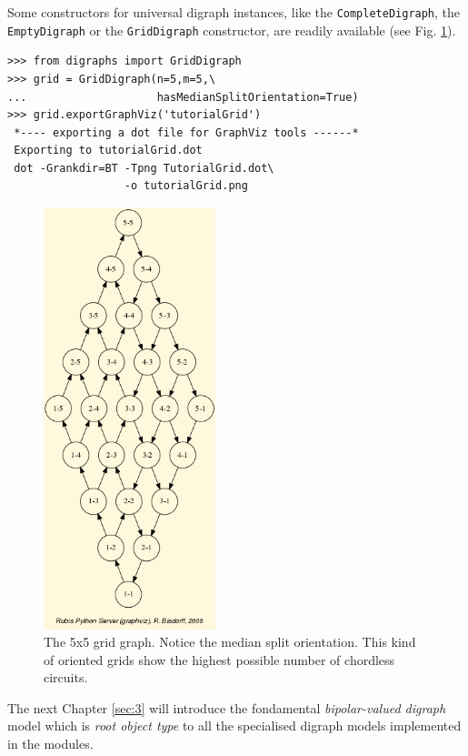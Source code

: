 Some constructors for universal digraph instances, like the \texttt{CompleteDigraph}, the \texttt{EmptyDigraph} or the \texttt{GridDigraph} constructor, are readily available (see Fig. \ref{fig:1.3}).
\begin{lstlisting}
>>> from digraphs import GridDigraph
>>> grid = GridDigraph(n=5,m=5,\
...                    hasMedianSplitOrientation=True)
>>> grid.exportGraphViz('tutorialGrid')
 *---- exporting a dot file for GraphViz tools ------*
 Exporting to tutorialGrid.dot
 dot -Grankdir=BT -Tpng TutorialGrid.dot\
                  -o tutorialGrid.png
\end{lstlisting}
\begin{figure}[h]
\sidecaption[t]
\includegraphics[width=5cm]{Figures/tutorialGrid.png}
\caption{The 5x5 grid graph. Notice the median split orientation. This kind of oriented grids show the highest possible number of chordless circuits. }
\label{fig:1.3}       %
\end{figure}

\vspace{1cm}
The next Chapter \ref{sec:3} will introduce the fondamental \emph{bipolar-valued digraph} model which is \emph{root object type} to all the specialised digraph models implemented in the \Digraph modules.    



